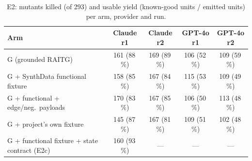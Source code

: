 \documentclass[preprint,12pt]{elsarticle}
\begin{document}
\begin{table}[t]
\centering\footnotesize\setlength{\tabcolsep}{4pt}
\caption{E2: mutants killed (of 293) and usable yield (known-good units / emitted units) per arm, provider and run.}
\label{tab:e2}
\begin{tabular}{lcccc}
\toprule
Arm & Claude r1 & Claude r2 & GPT-4o r1 & GPT-4o r2 \\
\midrule
G (grounded RAITG) & 161 (88\,\%) & 169 (89\,\%) & 106 (52\,\%) & 109 (59\,\%) \\
G + SynthData functional fixture & 158 (85\,\%) & 167 (84\,\%) & 115 (53\,\%) & 109 (49\,\%) \\
G + functional + edge/neg.\ payloads & 170 (83\,\%) & 167 (85\,\%) & 106 (50\,\%) & 113 (48\,\%) \\
G + project's own fixture & 145 (87\,\%) & 167 (81\,\%) & 109 (51\,\%) & 102 (48\,\%) \\
G + functional fixture + state contract (E2c) & 160 (93\,\%) & --- & --- & --- \\
\bottomrule
\end{tabular}
\end{table}

\begin{table}[t]
\centering\footnotesize
\caption{E2 paired versus G, same provider and run: difference in mutants killed, McNemar exact $p$, Holm-adjusted $p$ over the twelve pre-planned tests, bootstrap 95\,\% CI. The E2c arm was tested afterwards and is reported unadjusted.}
\label{tab:e2pair}
\end{table}
\end{document}
